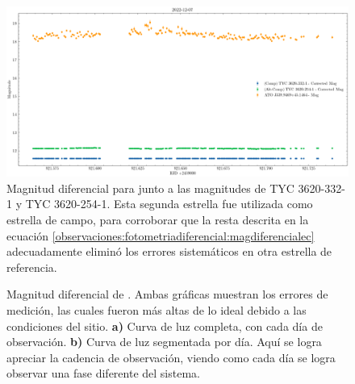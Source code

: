 \begin{figure}[!ht] 
	\centering
	\includegraphics[scale=0.5]{Observaciones/Secciones/Figures/Differential Magnitude 12-07.png}
	\caption{Magnitud diferencial para \atoObjId junto a las magnitudes de TYC
	3620-332-1 y TYC 3620-254-1. Esta segunda estrella fue utilizada como
	estrella de campo, para corroborar que la resta descrita en la ecuación
	\ref{observaciones:fotometriadiferencial:magdiferencialec} adecuadamente
	eliminó los errores sistemáticos en otra estrella de referencia.}
	\label{differentialMagDec7}
\end{figure}

\begin{figure}[!ht]
	\centering
	\caption{Magnitud diferencial de \atoObjIdNoSpace. Ambas gráficas muestran
	los errores de medición, las cuales fueron más altas de lo ideal debido a
	las condiciones del sitio. \textbf{a)} Curva de luz completa, con cada día
	de observación. \textbf{b)} Curva de luz segmentada por día. Aquí se logra
	apreciar la cadencia de observación, viendo como cada día se logra observar
	una fase diferente del sistema.}
	\label{iturbideAtoLightCurve}
\end{figure}